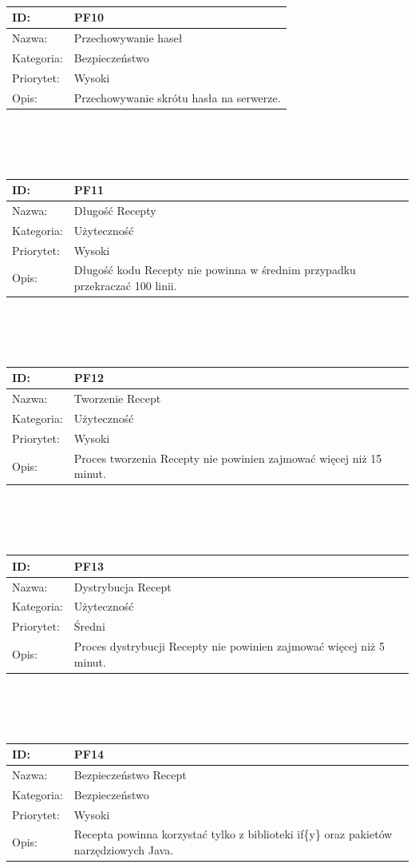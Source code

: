 \documentclass[11pt,a4paper,polish,thesis]{dcsbook}
\begin{document}
\begin{tabular}{|p{2cm}|p{12cm}|}
\\ \hline \end{tabular} \\\\\ \begin{tabular}{|p{2cm}|p{12cm}|}  \hline ID: &
PF10
\\ \hline Nazwa: &
Przechowywanie haseł
\\ \hline Kategoria: &
Bezpieczeństwo
\\ \hline Priorytet: &
Wysoki
\\ \hline Opis: &
Przechowywanie skrótu hasła na serwerze.
\\ \hline \end{tabular} \\\\\ \begin{tabular}{|p{2cm}|p{12cm}|}  \hline ID: &
PF11
\\ \hline Nazwa: &
Długość Recepty
\\ \hline Kategoria: &
Użyteczność
\\ \hline Priorytet: &
Wysoki
\\ \hline Opis: &
Długość kodu Recepty nie powinna w średnim przypadku przekraczać 100 linii.
\\ \hline \end{tabular} \\\\\ \begin{tabular}{|p{2cm}|p{12cm}|}  \hline ID: &
PF12
\\ \hline Nazwa: &
Tworzenie Recept
\\ \hline Kategoria: &
Użyteczność
\\ \hline Priorytet: &
Wysoki
\\ \hline Opis: &
Proces tworzenia Recepty nie powinien zajmować więcej niż 15 minut.
\\ \hline \end{tabular} \\\\\ \begin{tabular}{|p{2cm}|p{12cm}|}  \hline ID: &
PF13
\\ \hline Nazwa: &
Dystrybucja Recept
\\ \hline Kategoria: &
Użyteczność
\\ \hline Priorytet: &
Średni
\\ \hline Opis: &
Proces dystrybucji Recepty nie powinien zajmować więcej niż 5 minut.
\\ \hline \end{tabular} \\\\\ \begin{tabular}{|p{2cm}|p{12cm}|}  \hline ID: &
PF14
\\ \hline Nazwa: &
Bezpieczeństwo Recept
\\ \hline Kategoria: &
Bezpieczeństwo
\\ \hline Priorytet: &
Wysoki
\\ \hline Opis: &
Recepta powinna korzystać tylko z biblioteki if\{y\} oraz pakietów narzędziowych Java.
\\ \hline \end{tabular}
\end{document}
